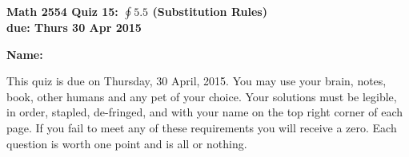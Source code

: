 \documentclass[12pt,letterpaper]{article}
\begin{document}
\flushleft
\begin{multicols}{2}


\textbf{Math 2554 Quiz 15: $\oint 5.5$ (Substitution Rules) \\
due: Thurs 30 Apr 2015}

\textbf{Name:  }\underline{\hspace{45ex}}

\vspace{.5in}

\end{multicols}

\pagestyle{empty}

\flushleft
This quiz is due on Thursday, 30 April, 2015. You may use your brain, notes, book, other humans and any pet of your choice. Your solutions must be legible, in order, stapled, de-fringed, and with your name on the top right corner of each page. If you fail to meet any of these requirements you will receive a zero. Each question is worth one point and is all or nothing.
\end{document}
